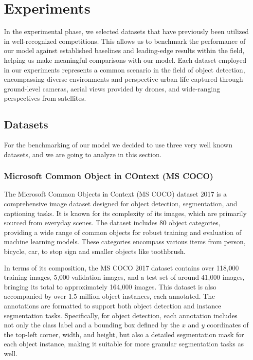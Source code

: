 \chapter{Experiments}

In the experimental phase, we selected datasets that have previously been utilized in well-recognized competitions. This allows us to benchmark the 
performance of our model against established baselines and leading-edge results within the field, helping us make meaningful comparisons with our model. 
Each dataset employed in our experiments represents a common scenario in the field of object detection, encompassing diverse environments and perspective 
urban life captured through ground-level cameras, aerial views provided by drones, and wide-ranging perspectives from satellites. 

\section{Datasets}
For the benchmarking of our model we decided to use three very well known datasets, and we are going to analyze in this section.


\subsection{Microsoft Common Object in COntext (MS COCO)}
The Microsoft Common Objects in Context (MS COCO) dataset 2017 \cite{COCOdataset} is a comprehensive image dataset designed for object detection, segmentation,
and captioning tasks. It is known for its complexity of its images, which are primarily sourced from everyday scenes. The dataset includes 80 object categories, 
providing a wide range of common objects for robust training and evaluation of machine learning models. These categories encompass various items from person, bicycle, 
car, to stop sign and smaller objects like toothbrush.

In terms of its composition, the MS COCO 2017 dataset contains over 118,000 training images, 5,000 validation images, and a test set of around 41,000 images, 
bringing its total to approximately 164,000 images. This dataset is also accompanied by over 1.5 million object instances, each annotated. 
The annotations are formatted to support both object detection and instance segmentation tasks. Specifically, for object detection, each annotation includes 
not only the class label and a bounding box defined by the $x$ and $y$ coordinates of the top-left corner, width, and height, but also a detailed segmentation 
mask for each object instance, making it suitable for more granular segmentation tasks as well.

